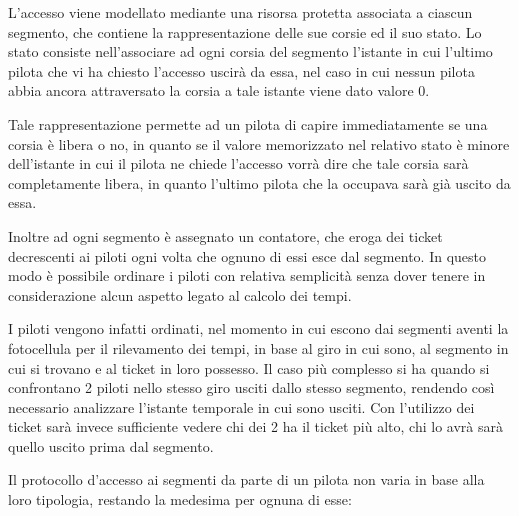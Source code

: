 \documentclass[a4paper,11pt, twoside, openright]{book}
\begin{document}
      L'accesso viene modellato mediante una risorsa protetta associata a ciascun segmento, che contiene
      la rappresentazione delle sue corsie ed il suo stato. Lo stato consiste nell'associare ad ogni corsia del segmento
      l'istante in cui l'ultimo pilota che vi ha chiesto l'accesso uscirà da essa,
      nel caso in cui nessun pilota abbia ancora attraversato la corsia a tale istante viene dato valore 0.
      
      Tale rappresentazione permette ad un pilota di capire immediatamente se una corsia è libera o no, in quanto
      se il valore memorizzato nel relativo stato è minore dell'istante in cui il pilota ne chiede l'accesso
      vorrà dire che tale corsia sarà completamente libera, in quanto l'ultimo pilota che la occupava sarà
      già uscito da essa.
      
      Inoltre ad ogni segmento è assegnato un contatore, che eroga dei ticket decrescenti ai piloti ogni volta che ognuno di
      essi esce dal segmento. In questo modo è possibile ordinare i piloti con relativa semplicità senza
      dover tenere in considerazione alcun aspetto legato al calcolo dei tempi. 
      
      I piloti vengono infatti ordinati, nel momento in cui escono dai segmenti aventi la fotocellula per il rilevamento dei tempi,
      in base al giro in cui sono, al segmento in cui si trovano e al ticket in loro possesso.
      Il caso più complesso si ha quando si confrontano 2 piloti nello stesso giro usciti dallo stesso segmento,
      rendendo così necessario analizzare l'istante temporale in cui sono usciti. Con l'utilizzo dei ticket sarà invece
      sufficiente vedere chi dei 2 ha il ticket più alto, chi lo avrà sarà quello uscito prima dal segmento.
      
      Il protocollo d'accesso ai segmenti da parte di un pilota non varia in base alla loro tipologia, restando la medesima 
      per ognuna di esse:
      
\end{document}
